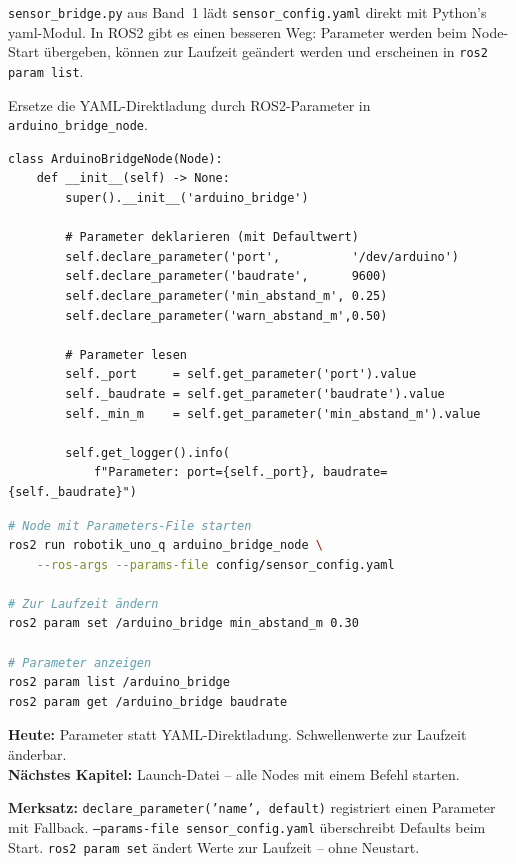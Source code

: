 \texttt{sensor\_bridge.py} aus Band~1 lädt \texttt{sensor\_config.yaml}
direkt mit Python's yaml-Modul.
In ROS2 gibt es einen besseren Weg:
Parameter werden beim Node-Start übergeben,
können zur Laufzeit geändert werden
und erscheinen in \texttt{ros2 param list}.

\begin{aufgabeBox}
Ersetze die YAML-Direktladung durch ROS2-Parameter in \texttt{arduino\_bridge\_node}.
\end{aufgabeBox}

\begin{lstlisting}
class ArduinoBridgeNode(Node):
    def __init__(self) -> None:
        super().__init__('arduino_bridge')

        # Parameter deklarieren (mit Defaultwert)
        self.declare_parameter('port',          '/dev/arduino')
        self.declare_parameter('baudrate',      9600)
        self.declare_parameter('min_abstand_m', 0.25)
        self.declare_parameter('warn_abstand_m',0.50)

        # Parameter lesen
        self._port     = self.get_parameter('port').value
        self._baudrate = self.get_parameter('baudrate').value
        self._min_m    = self.get_parameter('min_abstand_m').value

        self.get_logger().info(
            f"Parameter: port={self._port}, baudrate={self._baudrate}")
\end{lstlisting}

\begin{lstlisting}[language=bash]
# Node mit Parameters-File starten
ros2 run robotik_uno_q arduino_bridge_node \
    --ros-args --params-file config/sensor_config.yaml

# Zur Laufzeit ändern
ros2 param set /arduino_bridge min_abstand_m 0.30

# Parameter anzeigen
ros2 param list /arduino_bridge
ros2 param get /arduino_bridge baudrate
\end{lstlisting}

\begin{projektBox}
\textbf{Heute:} Parameter statt YAML-Direktladung. Schwellenwerte zur Laufzeit änderbar.\\
\textbf{Nächstes Kapitel:} Launch-Datei -- alle Nodes mit einem Befehl starten.
\end{projektBox}

\begin{merksatzBox}
\textbf{Merksatz:}
\texttt{declare\_parameter('name', default)} registriert einen Parameter mit Fallback.
\texttt{--params-file sensor\_config.yaml} überschreibt Defaults beim Start.
\texttt{ros2 param set} ändert Werte zur Laufzeit -- ohne Neustart.
\end{merksatzBox}


